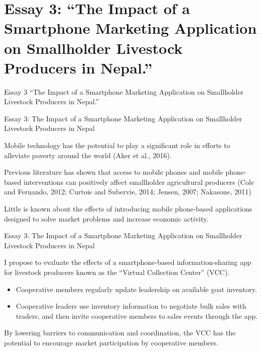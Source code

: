 \documentclass[aspectratio=169]{beamer}
\newenvironment{wideitemize}{\itemize\addtolength{\itemsep}{10pt}}{\enditemize}
\begin{document}
\section{Essay 3: ``The Impact of a Smartphone Marketing Application on Smallholder Livestock Producers in Nepal.''}

\begin{frame}{Essay 3}
\centering
\Large{``The Impact of a Smartphone Marketing Application on Smallholder Livestock Producers in Nepal.''}
\end{frame}


\begin{frame}{Essay 3: The Impact of a Smartphone Marketing Application on Smallholder Livestock Producers in Nepal}

    \begin{wideitemize}
        \item Mobile technology has the potential to play a significant role in efforts to alleviate poverty
around the world (Aker et al., 2016).
        \item Previous literature has shown that access to mobile phones and mobile phone-based interventions can positively affect smallholder agricultural producers (Cole and Fernando, 2012; Curtois and
        Subervie, 2014; Jensen, 2007; Nakasone, 2011)
        \item Little is known about the effects of introducing mobile phone-based applications designed to solve market problems and increase economic activity.
    \end{wideitemize}
\end{frame}

\begin{frame}{Essay 3: The Impact of a Smartphone Marketing Application on Smallholder Livestock Producers in Nepal}

    \begin{wideitemize}
        \item I propose to evaluate the effects of a smartphone-based information-sharing app for livestock producers known as the “Virtual Collection Center” (VCC). \vspace{.25cm}
        \begin{itemize}
            \item Cooperative members regularly update leadership on available goat inventory. \vspace{.25cm}
            \item Cooperative leaders use inventory information to negotiate bulk sales with traders, and then invite cooperative members to sales events through the app.
        \end{itemize}
        \item By lowering barriers to communication and coordination, the VCC has the potential to encourage market participation by cooperative members. 
    \end{wideitemize}
\end{frame}
\end{document}
